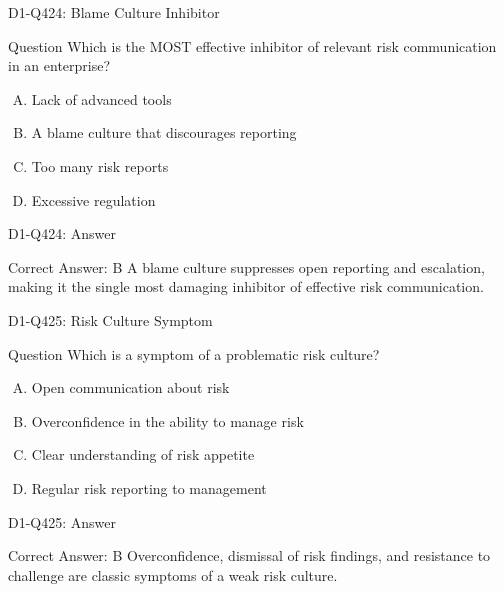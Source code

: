 \documentclass{beamer}
\begin{document}
\begin{frame}{D1-Q424: Blame Culture Inhibitor}
	\begin{block}{Question}
		Which is the MOST effective inhibitor of relevant risk communication in an enterprise?
	\end{block}
	\begin{enumerate}[(A)]
		\item Lack of advanced tools
		\item A blame culture that discourages reporting
		\item Too many risk reports
		\item Excessive regulation
	\end{enumerate}
\end{frame}
\begin{frame}{D1-Q424: Answer}
	\begin{block}{Correct Answer: B}
		A blame culture suppresses open reporting and escalation, making it the single most damaging inhibitor of effective risk communication.
	\end{block}
\end{frame}

\begin{frame}{D1-Q425: Risk Culture Symptom}
	\begin{block}{Question}
		Which is a symptom of a problematic risk culture?
	\end{block}
	\begin{enumerate}[(A)]
		\item Open communication about risk
		\item Overconfidence in the ability to manage risk
		\item Clear understanding of risk appetite
		\item Regular risk reporting to management
	\end{enumerate}
\end{frame}
\begin{frame}{D1-Q425: Answer}
	\begin{block}{Correct Answer: B}
		Overconfidence, dismissal of risk findings, and resistance to challenge are classic symptoms of a weak risk culture.
	\end{block}
\end{frame}
\end{document}
